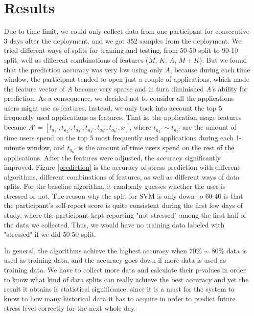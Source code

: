 \documentclass{article}
\begin{document}
\section{Results}
Due to time limit, we could only collect data from one participant for consecutive 3 days after the deployment, and we got 352 samples from the deployment. We tried different ways of splits for training and testing, from 50-50 split to 90-10 split,  well as different combinations of features ($M$, $K$, $A$, $M+K$). But we found that the prediction accuracy was very low using only $A$, because during each time window, the participant tended to open just a couple of applications, which made the feature vector of $A$ become very sparse and in turn diminished $A$'s ability for prediction. As a consequence, we decided not to consider all the applications users might use as features. Instead, we only took into account the top 5 frequently used applications as features. That is, the application usage features became $A'=[t_{a_1'}, t_{a_2'}, t_{a_3'}, t_{a_4'}, t_{a_5'}, t_{a_6'}, x]$, where $t_{a_1'}\sim t_{a_5'}$ are the amount of time users spend on the top 5 most frequently used applications during each 1-minute window, and $t_{a_6'}$ is the amount of time users spend on the rest of the applications. After the features were adjusted, the accuracy significantly improved. Figure \ref{prediction} is the accuracy of stress prediction with different algorithms, different combinations of features, as well as different ways of data splits. For the baseline algorithm, it randomly guesses whether the user is stressed or not. The reason why the split for SVM is only down to 60-40 is that the participant's self-report score is quite consistent during the first few days of study, where the participant kept reporting "not-stressed" among the first half of the data we collected. Thus, we would have no training data labeled with "stressed" if we did 50-50 split.

In general, the algorithms achieve the highest accuracy when 70\% $\sim$ 80\% data is used as training data, and the accuracy goes down if more data is used as training data. We have to collect more data and calculate their p-values in order to know what kind of data splits can really achieve the best accuracy and yet the result it obtains is statistical significance, since it is a must for the system to know to how many historical data it has to acquire in order to predict future stress level correctly for the next whole day. 
\end{document}
